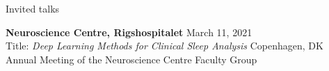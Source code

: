\documentclass{resume} %
\begin{document}
\begin{rSection}{Invited talks}


    {\bf Neuroscience Centre, Rigshospitalet} \hfill {March 11, 2021} \\
	Title: \textit{Deep Learning Methods for Clinical Sleep Analysis} \hfill {Copenhagen, DK} \\
	Annual Meeting of the Neuroscience Centre Faculty Group

\end{rSection}










\end{document}
